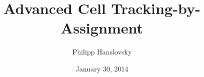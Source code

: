 




\title{Advanced Cell Tracking-by-Assignment}

\author{Philipp Hanslovsky}
\date{January 30, 2014}



\maketitle







\appendix %
\setcounter{finalframe}{\value{framenumber}}



\setcounter{framenumber}{\value{finalframe}}



